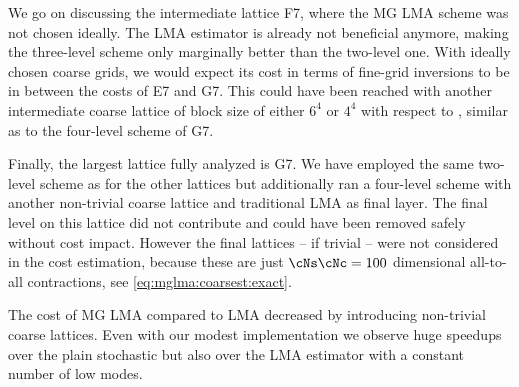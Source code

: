 We go on discussing the intermediate lattice F7, where the MG LMA scheme was not chosen ideally.
The LMA estimator is already not beneficial anymore, making the three-level scheme only marginally better than the two-level one.
With ideally chosen coarse grids, we would expect its cost in terms of fine-grid inversions to be in between the costs of E7 and G7.
This could have been reached with another intermediate coarse lattice of block size of either $6^4$ or $4^4$ with respect to , similar as to the four-level scheme of G7.

Finally, the largest lattice fully analyzed is G7.
We have employed the same two-level scheme as for the other lattices but additionally ran a four-level scheme with another non-trivial coarse lattice and traditional LMA as final layer.
The final level on this lattice did not contribute and could have been removed safely without cost impact.
However the final lattices -- if trivial -- were not considered in the cost estimation, because these are just $\cNs \cNc=100$ dimensional all-to-all contractions, see \cref{eq:mglma:coarsest:exact}.

The cost of MG LMA compared to LMA decreased by introducing non-trivial coarse lattices.
Even with our modest implementation we observe huge speedups over the plain stochastic but also over the LMA estimator with a constant number of low modes.

